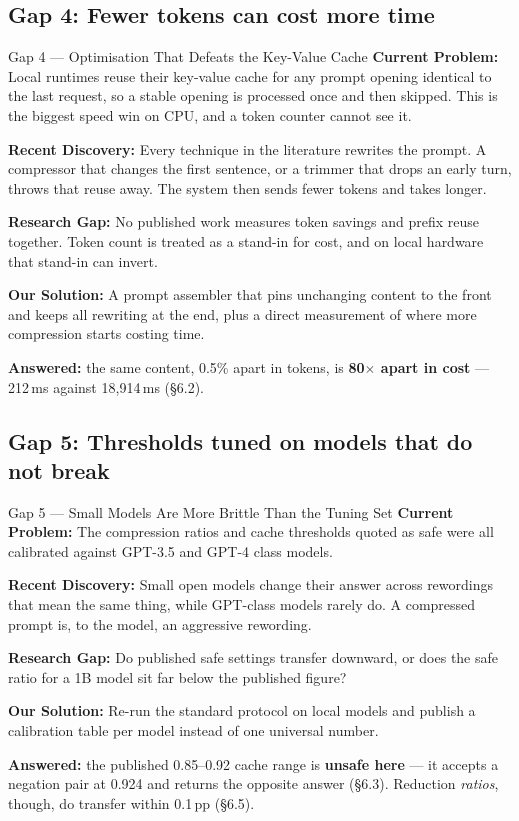 \documentclass[11pt,a4paper]{article}
\newcommand{\lbl}[1]{\textcolor{accent}{\textbf{#1}}}
\begin{document}
\subsection{Gap 4: Fewer tokens can cost more time}
\begin{gap}{Gap 4 --- Optimisation That Defeats the Key-Value Cache}
\lbl{Current Problem:} Local runtimes reuse their key-value cache for any prompt
opening identical to the last request, so a stable opening is processed once and then
skipped. This is the biggest speed win on CPU, and a token counter cannot see it.

\lbl{Recent Discovery:} Every technique in the literature rewrites the prompt. A
compressor that changes the first sentence, or a trimmer that drops an early turn,
throws that reuse away. The system then sends fewer tokens and takes longer.

\lbl{Research Gap:} No published work measures token savings and prefix reuse
together. Token count is treated as a stand-in for cost, and on local hardware that
stand-in can invert.

\lbl{Our Solution:} A prompt assembler that pins unchanging content to the front and
keeps all rewriting at the end, plus a direct measurement of where more compression
starts costing time.
\end{gap}
\textbf{Answered:} the same content, 0.5\% apart in tokens, is \textbf{80$\times$
apart in cost} --- 212\,ms against 18{,}914\,ms (\S6.2).

\subsection{Gap 5: Thresholds tuned on models that do not break}
\begin{gap}{Gap 5 --- Small Models Are More Brittle Than the Tuning Set}
\lbl{Current Problem:} The compression ratios and cache thresholds quoted as safe
were all calibrated against GPT-3.5 and GPT-4 class models.

\lbl{Recent Discovery:} Small open models change their answer across rewordings that
mean the same thing, while GPT-class models rarely do. A compressed prompt is, to the
model, an aggressive rewording.

\lbl{Research Gap:} Do published safe settings transfer downward, or does the safe
ratio for a 1B model sit far below the published figure?

\lbl{Our Solution:} Re-run the standard protocol on local models and publish a
calibration table per model instead of one universal number.
\end{gap}
\textbf{Answered:} the published 0.85--0.92 cache range is \textbf{unsafe here} --- it
accepts a negation pair at 0.924 and returns the opposite answer (\S6.3). Reduction
\emph{ratios}, though, do transfer within 0.1\,pp (\S6.5).
\end{document}
